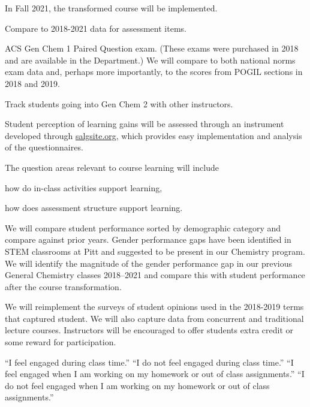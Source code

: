 \documentclass[10pt,letterpaper]{article}
\begin{document}
In Fall 2021, the transformed course will be implemented. 

%
%


 Compare to 2018-2021 data for assessment items.

 ACS Gen Chem 1 Paired Question exam. (These exams were purchased in 2018 and are available in the Department.) We will compare to both national norms exam data and, perhaps more importantly, to the scores from POGIL sections in 2018 and 2019.

 Track students going into Gen Chem 2 with other instructors. 

Student perception of learning gains will be assessed through an instrument developed through \url{salgsite.org}, which provides easy implementation and analysis of the questionnaires. 

The question areas relevant to course learning will include
\begin{enumerate*}[label=\textbf{\arabic*.)}]
  \item how do in-class activities support learning,
\item how does assessment structure support learning.
\end{enumerate*}

 We will compare student performance sorted by demographic category and compare against prior years. Gender performance gaps have been identified in STEM classrooms at Pitt and suggested to be present in our Chemistry program. We will identify the magnitude of the gender performance gap in our previous General Chemistry classes 2018--2021 and compare this with student performance after the course transformation.

We will reimplement the surveys of student opinions used in the 2018-2019 terms that captured student.
We will also capture data from concurrent \pogil and traditional lecture courses. Instructors will be encouraged to offer students extra credit or some reward for participation.

``I feel engaged during class time.'' ``I do not feel engaged during class time.'' ``I feel engaged when I am working on my homework or out of class assignments.'' ``I do not feel engaged when I am working on my homework or out of class assignments.''
\end{document}
